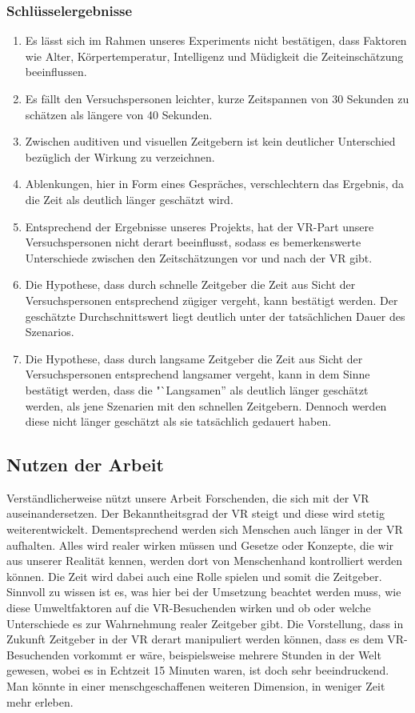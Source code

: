 \documentclass{Bericht}
\begin{document}
\subsubsection{Schlüsselergebnisse}
	\begin{enumerate}
		\item Es lässt sich im Rahmen unseres Experiments nicht bestätigen, dass Faktoren wie Alter, Körpertemperatur, Intelligenz und Müdigkeit die Zeiteinschätzung beeinflussen.
		\item Es fällt den Versuchspersonen leichter, kurze Zeitspannen von 30 Sekunden zu schätzen als längere von 40 Sekunden.
		\item Zwischen auditiven und visuellen Zeitgebern ist kein deutlicher Unterschied bezüglich der Wirkung zu verzeichnen.
		\item Ablenkungen, hier in Form eines Gespräches, verschlechtern das Ergebnis, da die Zeit als deutlich länger geschätzt wird. 
		\item Entsprechend der Ergebnisse unseres Projekts, hat der VR-Part unsere Versuchspersonen nicht derart beeinflusst, sodass es bemerkenswerte Unterschiede zwischen den Zeitschätzungen vor und nach der VR gibt.
		\item Die Hypothese, dass durch schnelle Zeitgeber die Zeit aus Sicht der Versuchspersonen entsprechend zügiger vergeht, kann bestätigt werden. Der geschätzte Durchschnittswert liegt  deutlich unter der tatsächlichen Dauer des Szenarios.
		\item Die Hypothese, dass durch langsame Zeitgeber die Zeit aus Sicht der Versuchspersonen entsprechend langsamer vergeht, kann in dem Sinne bestätigt werden, dass die "`Langsamen'' als deutlich länger geschätzt werden, als jene Szenarien mit den schnellen Zeitgebern. Dennoch werden diese nicht länger geschätzt als sie tatsächlich gedauert haben.
	\end{enumerate}

\subsection{Nutzen der Arbeit}
Verständlicherweise nützt unsere Arbeit Forschenden, die sich mit der VR auseinandersetzen. Der Bekanntheitsgrad der VR steigt und diese wird stetig weiterentwickelt. Dementsprechend werden sich Menschen auch länger in der VR aufhalten. Alles wird realer wirken müssen und Gesetze oder Konzepte, die wir aus unserer Realität kennen, werden dort von Menschenhand kontrolliert werden können. Die Zeit wird dabei auch eine Rolle spielen und somit die Zeitgeber. Sinnvoll zu wissen ist es, was hier bei der Umsetzung beachtet werden muss, wie diese Umweltfaktoren auf die VR-Besuchenden wirken und ob oder welche Unterschiede es zur Wahrnehmung realer Zeitgeber gibt. Die Vorstellung, dass in Zukunft Zeitgeber in der VR derart manipuliert werden können, dass es dem VR-Besuchenden vorkommt er wäre, beispielsweise mehrere Stunden in der Welt gewesen, wobei es in Echtzeit 15 Minuten waren, ist doch sehr beeindruckend. Man könnte in einer menschgeschaffenen weiteren Dimension, in weniger Zeit mehr erleben.
\end{document}
